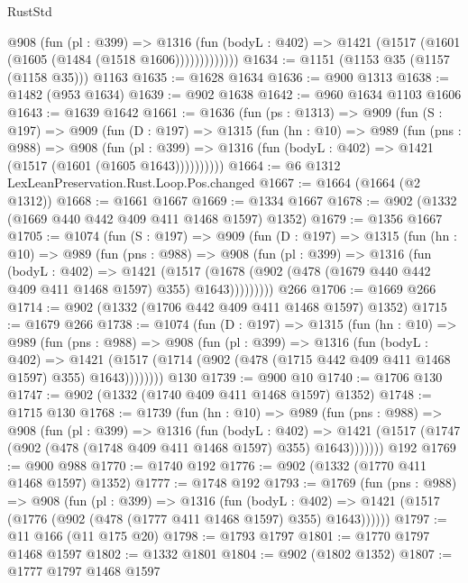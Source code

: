 \begin{lexlean}{RustStd}
\begin{coremodule}
              @908
                (fun (pl : @399) =>
                @1316
                  (fun (bodyL : @402) => @1421 (@1517 (@1601 (@1605 (@1484 (@1518 @1606)))))))))))))
@1634 := @1151 (@1153 @35 (@1157 (@1158 @35))) @1163
@1635 := @1628 @1634
@1636 := @900 @1313
@1638 := @1482 (@953 @1634)
@1639 := @902 @1638
@1642 := @960 @1634 @1103 @1606
@1643 := @1639 @1642
@1661 := @1636
    (fun (ps : @1313) =>
    @909
      (fun (S : @197) =>
      @909
        (fun (D : @197) =>
        @1315
          (fun (hn : @10) =>
          @989
            (fun (pns : @988) =>
            @908
              (fun (pl : @399) =>
              @1316 (fun (bodyL : @402) => @1421 (@1517 (@1601 (@1605 @1643))))))))))
@1664 := @6 @1312 LexLeanPreservation.Rust.Loop.Pos.changed
@1667 := @1664 (@1664 (@2 @1312))
@1668 := @1661 @1667
@1669 := @1334 @1667
@1678 := @902 (@1332 (@1669 @440 @442 @409 @411 @1468 @1597) @1352)
@1679 := @1356 @1667
@1705 := @1074
    (fun (S : @197) =>
    @909
      (fun (D : @197) =>
      @1315
        (fun (hn : @10) =>
        @989
          (fun (pns : @988) =>
          @908
            (fun (pl : @399) =>
            @1316
              (fun (bodyL : @402) =>
              @1421
                (@1517
                  (@1678 (@902 (@478 (@1679 @440 @442 @409 @411 @1468 @1597) @355) @1643)))))))))
    @266
@1706 := @1669 @266
@1714 := @902 (@1332 (@1706 @442 @409 @411 @1468 @1597) @1352)
@1715 := @1679 @266
@1738 := @1074
    (fun (D : @197) =>
    @1315
      (fun (hn : @10) =>
      @989
        (fun (pns : @988) =>
        @908
          (fun (pl : @399) =>
          @1316
            (fun (bodyL : @402) =>
            @1421 (@1517 (@1714 (@902 (@478 (@1715 @442 @409 @411 @1468 @1597) @355) @1643))))))))
    @130
@1739 := @900 @10
@1740 := @1706 @130
@1747 := @902 (@1332 (@1740 @409 @411 @1468 @1597) @1352)
@1748 := @1715 @130
@1768 := @1739
    (fun (hn : @10) =>
    @989
      (fun (pns : @988) =>
      @908
        (fun (pl : @399) =>
        @1316
          (fun (bodyL : @402) =>
          @1421 (@1517 (@1747 (@902 (@478 (@1748 @409 @411 @1468 @1597) @355) @1643)))))))
    @192
@1769 := @900 @988
@1770 := @1740 @192
@1776 := @902 (@1332 (@1770 @411 @1468 @1597) @1352)
@1777 := @1748 @192
@1793 := @1769
    (fun (pns : @988) =>
    @908
      (fun (pl : @399) =>
      @1316
        (fun (bodyL : @402) =>
        @1421 (@1517 (@1776 (@902 (@478 (@1777 @411 @1468 @1597) @355) @1643))))))
@1797 := @11 @166 (@11 @175 @20)
@1798 := @1793 @1797
@1801 := @1770 @1797 @1468 @1597
@1802 := @1332 @1801
@1804 := @902 (@1802 @1352)
@1807 := @1777 @1797 @1468 @1597

\end{coremodule}
\end{lexlean}
